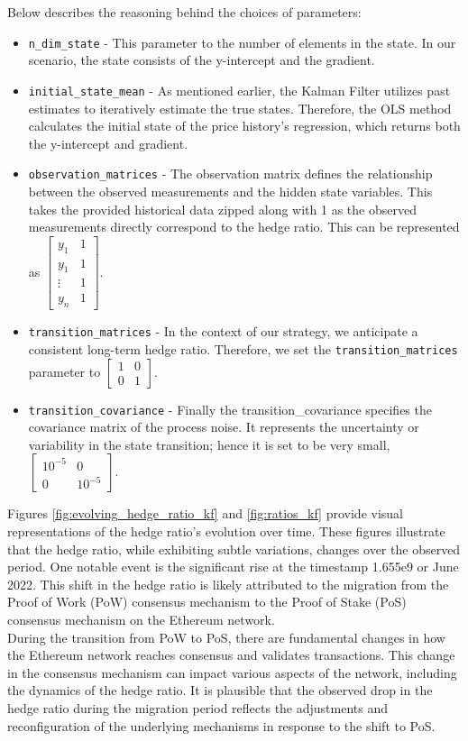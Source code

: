 \noindent Below describes the reasoning behind the choices of parameters:
\begin{itemize}
    \item \texttt{n\_dim\_state} - This parameter to the number of elements in the state. In our scenario, the state consists of the y-intercept and the gradient.
    \item \texttt{initial\_state\_mean} - As mentioned earlier, the Kalman Filter utilizes past estimates to iteratively estimate the true states. Therefore, the OLS method calculates the initial state of the price history's regression, which returns both the y-intercept and gradient.
    \item \texttt{observation\_matrices} - The observation matrix defines the relationship between the observed measurements and the hidden state variables. This takes the provided historical data zipped along with 1 as the observed measurements directly correspond to the hedge ratio. This can be represented as $\begin{bmatrix} y_1 & 1 \\ y_1 & 1 \\ \vdots & 1 \\ y_n & 1\end{bmatrix}$.
    \item \texttt{transition\_matrices} - In the context of our strategy, we anticipate a consistent long-term hedge ratio. Therefore, we set the \texttt{transition\_matrices} parameter to $\begin{bmatrix} 1 & 0\\ 0 & 1 \end{bmatrix}$.
    \item \texttt{transition\_covariance} - Finally the transition\_covariance specifies the covariance matrix of the process noise. It represents the uncertainty or variability in the state transition; hence it is set to be very small, $\begin{bmatrix} 10^{-5} & 0\\ 0 & 10^{-5} \end{bmatrix}$.
\end{itemize}

\noindent Figures \ref{fig:evolving_hedge_ratio_kf} and \ref{fig:ratios_kf} provide visual representations of the hedge ratio's evolution over time. These figures illustrate that the hedge ratio, while exhibiting subtle variations, changes over the observed period. One notable event is the significant rise at the timestamp 1.655e9 or June 2022. This shift in the hedge ratio is likely attributed to the migration from the Proof of Work (PoW) consensus mechanism to the Proof of Stake (PoS) consensus mechanism on the Ethereum network.
\\[3mm]
During the transition from PoW to PoS, there are fundamental changes in how the Ethereum network reaches consensus and validates transactions. This change in the consensus mechanism can impact various aspects of the network, including the dynamics of the hedge ratio. It is plausible that the observed drop in the hedge ratio during the migration period reflects the adjustments and reconfiguration of the underlying mechanisms in response to the shift to PoS.

